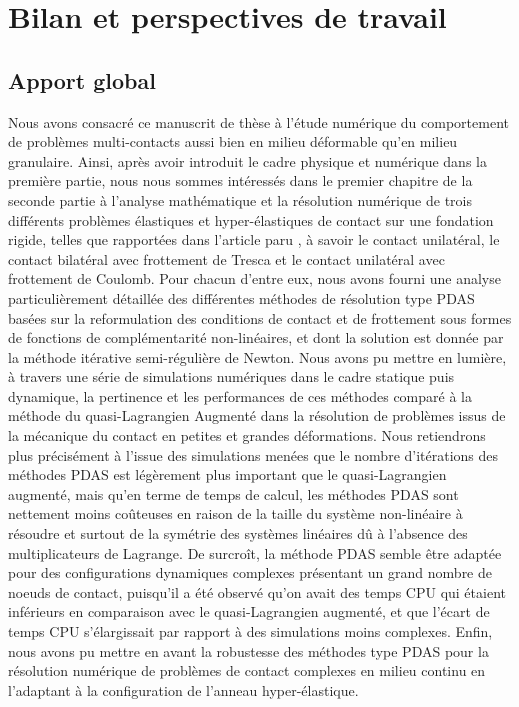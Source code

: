 \chapter{Bilan et perspectives de travail}\label{chap:conclusion-persp}

\vspace{1cm}

\minitoc

\newpage

\section{Apport global}

Nous avons consacré ce manuscrit de thèse à l'étude numérique du comportement de problèmes multi-contacts aussi bien en milieu déformable qu'en milieu granulaire. Ainsi, après avoir introduit le cadre physique et numérique dans la première partie, nous nous sommes intéressés dans le premier chapitre de la seconde partie à l'analyse mathématique et la résolution numérique de trois différents problèmes élastiques et hyper-élastiques de contact sur une fondation rigide, telles que rapportées dans l'article paru \cite{abide2021inexact}, à savoir le contact unilatéral, le contact bilatéral avec frottement de Tresca et le contact unilatéral avec frottement de Coulomb. Pour chacun d'entre eux, nous avons fourni une analyse particulièrement détaillée des différentes méthodes de résolution type PDAS basées sur la reformulation des conditions de contact et de frottement sous formes de fonctions de complémentarité non-linéaires, et dont la solution est donnée par la méthode itérative semi-régulière de Newton. Nous avons pu mettre en lumière, à travers une série de simulations numériques dans le cadre statique puis dynamique, la pertinence et les performances de ces méthodes comparé à la méthode du quasi-Lagrangien Augmenté dans la résolution de problèmes issus de la mécanique du contact en petites et grandes déformations. Nous retiendrons plus précisément à l'issue des simulations menées que le nombre d'itérations des méthodes PDAS est légèrement plus important que le quasi-Lagrangien augmenté, mais qu'en terme de temps de calcul, les méthodes PDAS sont nettement moins coûteuses en raison de la taille du système non-linéaire à résoudre et surtout de la symétrie des systèmes linéaires dû à l'absence des multiplicateurs de Lagrange. De surcroît, la méthode PDAS semble être adaptée pour des configurations dynamiques complexes présentant un grand nombre de noeuds de contact, puisqu'il a été observé qu'on avait des temps CPU qui étaient inférieurs  en comparaison avec le quasi-Lagrangien augmenté, et que l'écart de temps CPU s'élargissait par rapport à des simulations moins complexes. Enfin, nous avons pu mettre en avant la robustesse des méthodes type PDAS pour la résolution numérique de problèmes de contact complexes en milieu continu en l'adaptant à la configuration de l'anneau hyper-élastique.\\

